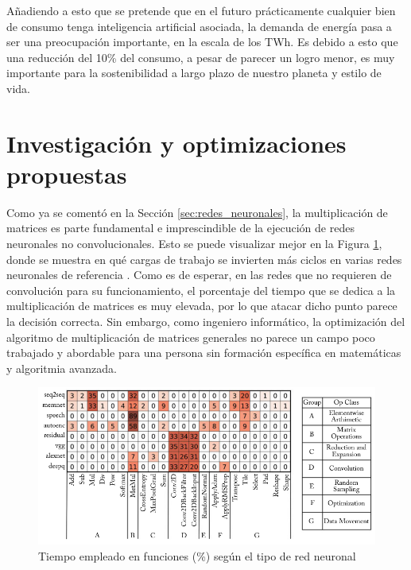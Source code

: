 Añadiendo a esto que se pretende que en el futuro prácticamente cualquier bien de consumo tenga inteligencia artificial asociada, la demanda de energía pasa a ser una preocupación importante, en la escala de los TWh. Es debido a esto que una reducción del 10\% del consumo, a pesar de parecer un logro menor, es muy importante para la sostenibilidad a largo plazo de nuestro planeta y estilo de vida.

\section{Investigación y optimizaciones propuestas}
\label{sec:investigacion_optimizaciones_propuestas}
Como ya se comentó en la Sección \ref{sec:redes_neuronales}, la multiplicación de matrices es parte fundamental e imprescindible de la ejecución de redes neuronales no convolucionales. Esto se puede visualizar mejor en la Figura \ref{fig:profiling_several_nns}, donde se muestra en qué cargas de trabajo se invierten más ciclos en varias redes neuronales de referencia \cite[Figura 3.4]{deep_learning_for_computer_architects}. Como es de esperar, en las redes que no requieren de convolución para su funcionamiento, el porcentaje del tiempo que se dedica a la multiplicación de matrices es muy elevada, por lo que atacar dicho punto parece la decisión correcta. Sin embargo, como ingeniero informático, la optimización del algoritmo de multiplicación de matrices generales no parece un campo poco trabajado y abordable para una persona sin formación específica en matemáticas y algoritmia avanzada.

\begin{figure}[h!]
    \centering
    \includegraphics[width=\textwidth]{pdf_tex/dlfca_figure3_4.pdf}
    \caption{Tiempo empleado en funciones (\%) según el tipo de red neuronal}
    \label{fig:profiling_several_nns}
\end{figure}

